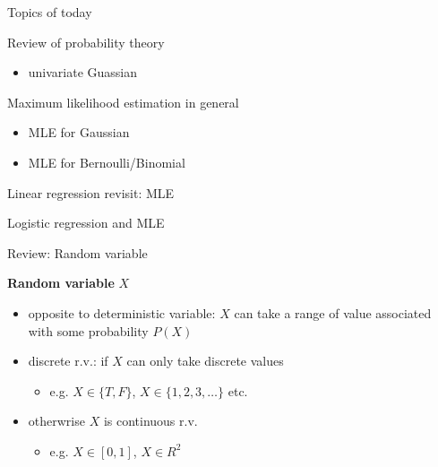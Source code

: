 \documentclass[ignorenonframetext,]{beamer}
\providecommand{\tightlist}{%
  \setlength{\itemsep}{0pt}\setlength{\parskip}{0pt}}
\begin{document}
\begin{frame}{Topics of today}
\protect\hypertarget{topics-of-today}{}

Review of probability theory

\begin{itemize}
\tightlist
\item
  univariate Guassian
\end{itemize}

\bigskip

Maximum likelihood estimation in general

\begin{itemize}
\tightlist
\item
  MLE for Gaussian
\item
  MLE for Bernoulli/Binomial 
\end{itemize}

\bigskip

Linear regression revisit: MLE

\bigskip

Logistic regression and MLE

\end{frame}

\begin{frame}{Review: Random variable}
\protect\hypertarget{review-random-variable}{}

\textbf{Random variable} \(X\)

\begin{itemize}
\tightlist
\item
  opposite to deterministic variable: \(X\) can take a range of value
  associated with some probability \(P(X)\)
\item
  discrete r.v.: if \(X\) can only take discrete values

  \begin{itemize}
  \tightlist
  \item
    e.g. \(X\in \{T, F\}\), \(X\in \{1,2,3,\ldots\}\) etc.
  \end{itemize}
\item
  otherwrise \(X\) is continuous r.v.

  \begin{itemize}
  \tightlist
  \item
    e.g. \(X\in [0,1]\), \(X\in R^2\)
  \end{itemize}
\end{itemize}

\end{frame}
\end{document}
